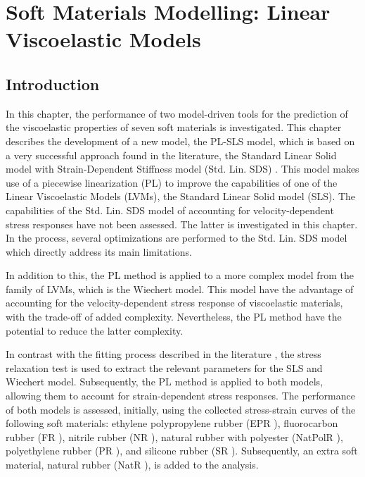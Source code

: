 \chapter{Soft Materials Modelling: Linear Viscoelastic Models} \label{sec:ChapterModellingLVM}


\section{Introduction}

In this chapter, the performance of two model-driven tools for the prediction of the viscoelastic properties of seven soft materials is investigated. This chapter describes the development of a new model, the PL-SLS model, which is based on a very successful approach found in the literature, the Standard Linear Solid model with Strain-Dependent Stiffness model (Std. Lin. SDS) \cite{austin2015control}. This model makes use of a piecewise linearization (PL) to improve the capabilities of one of the Linear Viscoelastic Models (LVMs), the Standard Linear Solid model (SLS). The capabilities of the Std. Lin. SDS model of accounting for velocity-dependent stress responses have not been assessed. The latter is investigated in this chapter. In the process, several optimizations are performed to the Std. Lin. SDS model which directly address its main limitations. 

In addition to this, the PL method is applied to a more complex model from the family of LVMs, which is the Wiechert model. This model have the advantage of accounting for the velocity-dependent stress response of viscoelastic materials, with the trade-off of added complexity. Nevertheless, the PL method have the potential to reduce the latter complexity.

In contrast with the fitting process described in the literature \cite{austin2015control}, the stress relaxation test is used to extract the relevant parameters for the SLS and Wiechert model. Subsequently, the PL method is applied to both models, allowing them to account for strain-dependent stress responses. The performance of both models is assessed, initially, using the collected stress-strain curves of the following soft materials: ethylene polypropylene rubber (EPR \cite{EPRubber2019}), fluorocarbon rubber (FR \cite{FRubber2019}), nitrile rubber (NR \cite{NRubber2019}), natural rubber with polyester (NatPolR \cite{NatPolRubber2019}),  polyethylene  rubber  (PR \cite{PRubber2019}), and  silicone  rubber  (SR \cite{SRubber2019}). Subsequently, an extra soft material, natural rubber (NatR \cite{NatRubber2019}), is added to the analysis.

